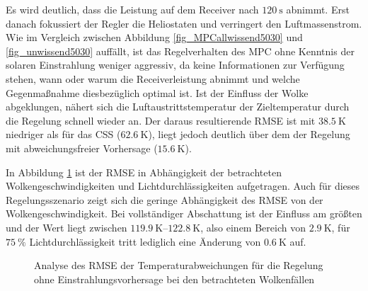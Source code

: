 Es wird deutlich, dass die Leistung auf dem Receiver nach $\SI{120}{\second}$ abnimmt.
Erst danach fokussiert der Regler die Heliostaten und verringert den Luftmassenstrom.
Wie im Vergleich zwischen Abbildung  \ref{fig_MPCallwissend5030} und \ref{fig_unwissend5030} auffällt, ist das Regelverhalten des MPC ohne Kenntnis der solaren Einstrahlung weniger aggressiv, da keine Informationen zur Verfügung stehen, wann oder warum die Receiverleistung abnimmt und welche Gegenmaßnahme diesbezüglich optimal ist.
Ist der Einfluss der Wolke abgeklungen, nähert sich die Luftaustrittstemperatur der Zieltemperatur durch die Regelung schnell wieder an.
Der daraus resultierende RMSE ist mit $\SI{38.5}{\kelvin}$ niedriger als für das CSS ($\SI{62.6}{\kelvin}$), liegt jedoch deutlich über dem der Regelung mit abweichungsfreier Vorhersage ($\SI{15.6}{\kelvin}$).

In Abbildung \ref{fig_RMSE3Dunwissend} ist der RMSE in Abhängigkeit der betrachteten Wolkengeschwindigkeiten und Lichtdurchlässigkeiten aufgetragen.
Auch für dieses Regelungsszenario zeigt sich die geringe Abhängigkeit des RMSE von der Wolkengeschwindigkeit.
Bei vollständiger Abschattung ist der Einfluss am größten und der Wert liegt zwischen $\SIrange{119.9}{122.8}{\kelvin}$, also einem Bereich von $\SI{2.9}{\kelvin}$, für $\SI{75}{\percent}$ Lichtdurchlässigkeit tritt lediglich eine Änderung von $\SI{0.6}{\kelvin}$ auf.

\begin{figure}[h!]
    \centering
    \setlength{\fboxsep}{1pt}
    \setlength{\fboxrule}{1pt}
\caption[Analyse des RMSE der Temperaturabweichungen für die Regelung ohne Einstrahlungsvorhersage bei den betrachteten Wolkenfällen]{Analyse des RMSE der Temperaturabweichungen für die Regelung ohne Einstrahlungsvorhersage bei den betrachteten Wolkenfällen}
    \label{fig_RMSE3Dunwissend}
\end{figure}

